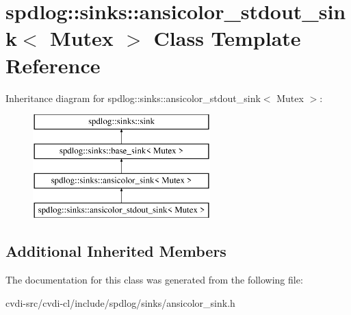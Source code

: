 \hypertarget{classspdlog_1_1sinks_1_1ansicolor__stdout__sink}{}\section{spdlog\+:\+:sinks\+:\+:ansicolor\+\_\+stdout\+\_\+sink$<$ Mutex $>$ Class Template Reference}
\label{classspdlog_1_1sinks_1_1ansicolor__stdout__sink}
Inheritance diagram for spdlog\+:\+:sinks\+:\+:ansicolor\+\_\+stdout\+\_\+sink$<$ Mutex $>$\+:\begin{figure}[H]
\begin{center}
\leavevmode
\includegraphics[height=4.000000cm]{classspdlog_1_1sinks_1_1ansicolor__stdout__sink}
\end{center}
\end{figure}
\subsection*{Additional Inherited Members}


The documentation for this class was generated from the following file\+:\begin{DoxyCompactItemize}
\item 
cvdi-\/src/cvdi-\/cl/include/spdlog/sinks/ansicolor\+\_\+sink.\+h\end{DoxyCompactItemize}
